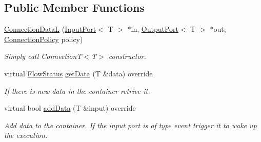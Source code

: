 \subsection*{Public Member Functions}
\begin{DoxyCompactItemize}
\item 
\hypertarget{classcoco_1_1_connection_data_l_a2e4d4feb75319345f32f2355456105b0}{\hyperlink{classcoco_1_1_connection_data_l_a2e4d4feb75319345f32f2355456105b0}{Connection\-Data\-L} (\hyperlink{classcoco_1_1_input_port}{Input\-Port}$<$ T $>$ $\ast$in, \hyperlink{classcoco_1_1_output_port}{Output\-Port}$<$ T $>$ $\ast$out, \hyperlink{structcoco_1_1_connection_policy}{Connection\-Policy} policy)}\label{classcoco_1_1_connection_data_l_a2e4d4feb75319345f32f2355456105b0}

\begin{DoxyCompactList}\small\item\em Simply call Connection\-T$<$\-T$>$ constructor. \end{DoxyCompactList}\item 
\hypertarget{classcoco_1_1_connection_data_l_a182d9bc170db89f0ed0b4b74abf8e107}{virtual \hyperlink{namespacecoco_a057be58377e415c9be98c1dc5c8426ad}{Flow\-Status} \hyperlink{classcoco_1_1_connection_data_l_a182d9bc170db89f0ed0b4b74abf8e107}{get\-Data} (T \&data) override}\label{classcoco_1_1_connection_data_l_a182d9bc170db89f0ed0b4b74abf8e107}

\begin{DoxyCompactList}\small\item\em If there is new data in the container retrive it. \end{DoxyCompactList}\item 
\hypertarget{classcoco_1_1_connection_data_l_a9c934c06e92dcc6e4442b6ab68b845b7}{virtual bool \hyperlink{classcoco_1_1_connection_data_l_a9c934c06e92dcc6e4442b6ab68b845b7}{add\-Data} (T \&input) override}\label{classcoco_1_1_connection_data_l_a9c934c06e92dcc6e4442b6ab68b845b7}

\begin{DoxyCompactList}\small\item\em Add data to the container. If the input port is of type event trigger it to wake up the execution. \end{DoxyCompactList}\end{DoxyCompactItemize}
